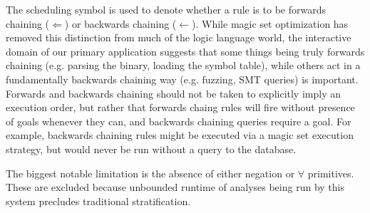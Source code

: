 \documentclass{article}
\begin{document}
The scheduling symbol is used to denote whether a rule is to be forwards chaining ($\Leftarrow$) or backwards chaining ($\leftarrow$).
While magic set optimization has removed this distinction from much of the logic language world, the interactive domain of our primary application suggests that some things being truly forwards chaining (e.g. parsing the binary, loading the symbol table), while others act in a fundamentally backwards chaining way (e.g. fuzzing, SMT queries) is important.
Forwards and backwards chaining should not be taken to explicitly imply an execution order, but rather that forwards chaing rules will fire without presence of goals whenever they can, and backwards chaining queries require a goal.
For example, backwards chaining rules might be executed via a magic set execution strategy, but would never be run without a query to the database.

The biggest notable limitation is the absence of either negation or $\forall$ primitives.
These are excluded because unbounded runtime of analyses being run by this system precludes traditional stratification.
\end{document}
